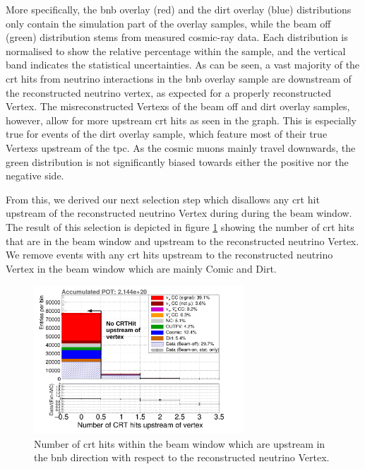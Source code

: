 More specifically, the \gls{bnb} overlay (red) and the dirt overlay (blue) distributions only contain the simulation part of the overlay samples, while the beam off (green) distribution stems from measured cosmic-ray data. Each distribution is normalised to show the relative percentage within the sample, and the vertical band indicates the statistical uncertainties. As can be seen, a vast majority of the \gls{crt} hits from neutrino interactions in the \gls{bnb} overlay sample are downstream of the reconstructed neutrino vertex, as expected for a properly reconstructed \gls{Vertex}. The misreconstructed \glspl{Vertex} of the beam off and dirt overlay samples, however, allow for more upstream \gls{crt} hits as seen in the graph. This is especially true for events of the dirt overlay sample, which feature most of their true \glspl{Vertex} upstream of the \gls{tpc}. As the cosmic muons mainly travel downwards, the green distribution is not significantly biased towards either the positive nor the negative side.

From this, we derived our next selection step which disallows any \gls{crt} hit upstream of the reconstructed neutrino \gls{Vertex} during during the beam window. The result of this selection is depicted in figure \ref{fig:no_upstream_CRT_cut2} showing the number of \gls{crt} hits that are in the beam window and upstream to the reconstructed neutrino \gls{Vertex}.
We remove events with any \gls{crt} hits upstream to the reconstructed neutrino \gls{Vertex} in the beam window which are mainly Comic and Dirt.
\begin{figure}[htbp]
  \centering
  \includegraphics[width=0.7\textwidth]{images/NewCCInclusive/selection/No_upstream_CRT_2.pdf}
  \caption[CRT hit Upstream of Vertex Cut]{Number of \gls{crt} hits within the beam window which are upstream in the \gls{bnb} direction with respect to the reconstructed neutrino \gls{Vertex}.}
  \label{fig:no_upstream_CRT_cut2}
\end{figure}

